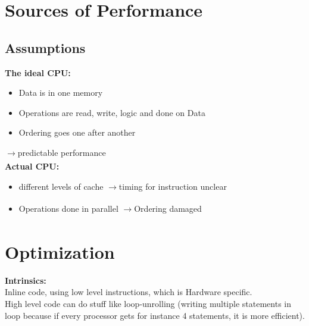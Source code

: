 \documentclass[a4paper]{article}
\newcommand{\arrow}{$\xrightarrow[]{}$}
\begin{document}
\section{Sources of Performance}
\subsection{Assumptions}
{\bf The ideal CPU:}
\begin{itemize}
\setlength{\itemsep}{-3pt}
\item Data is in one memory
\item Operations are read, write, logic and done on Data
\item Ordering goes one after another
\end{itemize}
\arrow predictable performance\\
{\bf Actual CPU:}
\begin{itemize}
\setlength{\itemsep}{-3pt}
\item different levels of cache \arrow timing for instruction unclear
\item Operations done in parallel \arrow Ordering damaged
\end{itemize}

\section{Optimization}
{\bf Intrinsics:}\\
Inline code, using low level instructions, which is Hardware specific.\\
High level code can do stuff like loop-unrolling (writing multiple statements in loop because if every processor gets for instance 4 statements, it is more efficient).
\end{document}
